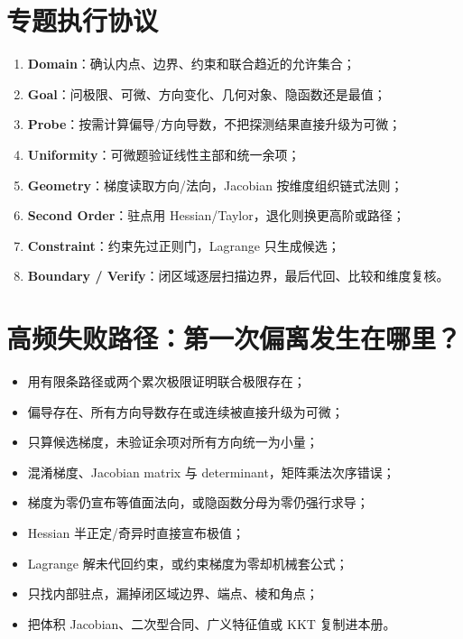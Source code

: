 \documentclass[11pt,a4paper,fontset=fandol]{ctexart}
\newcommand{\kw}[1]{\textbf{\color{deep}#1}}
\begin{document}
\section{专题执行协议}
\begin{enumerate}
  \item \kw{Domain}：确认内点、边界、约束和联合趋近的允许集合；
  \item \kw{Goal}：问极限、可微、方向变化、几何对象、隐函数还是最值；
  \item \kw{Probe}：按需计算偏导/方向导数，不把探测结果直接升级为可微；
  \item \kw{Uniformity}：可微题验证线性主部和统一余项；
  \item \kw{Geometry}：梯度读取方向/法向，Jacobian 按维度组织链式法则；
  \item \kw{Second Order}：驻点用 Hessian/Taylor，退化则换更高阶或路径；
  \item \kw{Constraint}：约束先过正则门，Lagrange 只生成候选；
  \item \kw{Boundary / Verify}：闭区域逐层扫描边界，最后代回、比较和维度复核。
\end{enumerate}

\section{高频失败路径：第一次偏离发生在哪里？}
\begin{itemize}
  \item 用有限条路径或两个累次极限证明联合极限存在；
  \item 偏导存在、所有方向导数存在或连续被直接升级为可微；
  \item 只算候选梯度，未验证余项对所有方向统一为小量；
  \item 混淆梯度、Jacobian matrix 与 determinant，矩阵乘法次序错误；
  \item 梯度为零仍宣布等值面法向，或隐函数分母为零仍强行求导；
  \item Hessian 半正定/奇异时直接宣布极值；
  \item Lagrange 解未代回约束，或约束梯度为零却机械套公式；
  \item 只找内部驻点，漏掉闭区域边界、端点、棱和角点；
  \item 把体积 Jacobian、二次型合同、广义特征值或 KKT 复制进本册。
\end{itemize}
\end{document}
